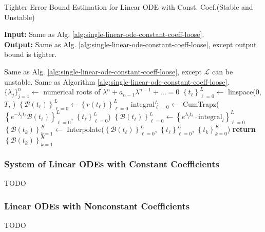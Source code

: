 \documentclass[accepted]{uai2023}
\newcommand{\Bound}{\mathcal{B}}
\renewcommand{\L}{\mathcal{L}}
\begin{document}
    \begin{algorithm}
        \small
        \caption{Tighter Error Bound Estimation for Linear ODE with Const. Coef.\quad  (Stable and Unstable)}\label{alg:single-linear-ode-constant-coeff-tight}
        \textbf{Input:} Same as Alg. \ref{alg:single-linear-ode-constant-coeff-loose}. \\
        \textbf{Output:} Same as Alg. \ref{alg:single-linear-ode-constant-coeff-loose}, except output bound is tighter.
        \begin{algorithmic}
            \Require Same as Alg. \ref{alg:single-linear-ode-constant-coeff-loose}, except $\L$ can be unstable.
            \Ensure Same as Algorithm \ref{alg:single-linear-ode-constant-coeff-loose}. 
            \vspace{0.5em}
            \State $\{\lambda_j\}_{j=1}^{n} \gets$ numerical roots of $\lambda^n+a_{n-1}\lambda^{n-1}+\dots=0$
            \State $\left\{t_\ell\right\}_{\ell=0}^{L} \gets$ linspace($0$, $T$, )
            \State $\left\{\Bound(t_\ell)\right\}_{\ell=0}^{L} \gets \left\{r(t_\ell)\right\}_{\ell=0}^{L}$
                \State integral$_{\ell=0}^{L} \gets$ CumTrapz($\left\{e^{-\lambda_j t_{\ell}} \Bound(t_\ell)\right\}_{\ell=0}^{L}$, $\left\{t_\ell\right\}_{\ell=0}^{L}$) %
                \State $\left\{\Bound(t_\ell)\right\}_{\ell=0}^{L} \gets \left\{e^{\lambda_j t_{\ell}}\cdot \text{integral}_l \right\}_{\ell=0}^{L}$ 
            \EndFor
            \State $\left\{\Bound(t_k)\right\}_{k=1}^{K} \gets $ Interpolate($\left\{\Bound(t_\ell)\right\}_{\ell=0}^{L}$, $\left\{t_\ell\right\}_{\ell=0}^{L}$, $\left\{t_k\right\}_{k=0}^{K}$) %
            \State \textbf{return} $\left\{\Bound(t_k)\right\}_{k=1}^{K}$ 
        \end{algorithmic}
    \end{algorithm}

\subsubsection{System of Linear ODEs with Constant Coefficients} \label{section:system-of-linear-odes-with-constant-coefficients}
    TODO

\subsubsection{Linear ODEs with Nonconstant Coefficients}
    TODO
\end{document}
